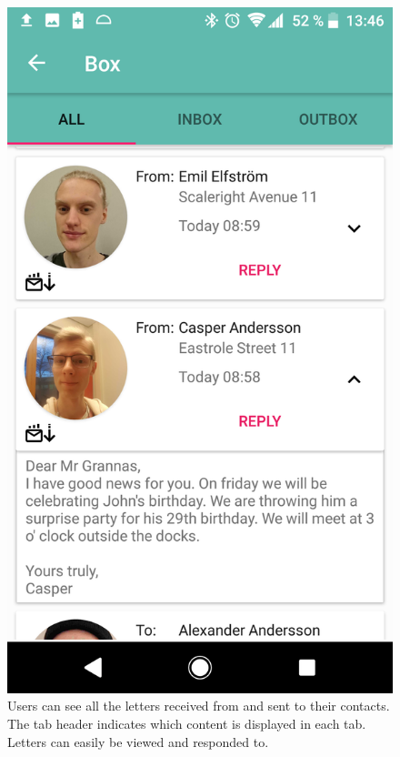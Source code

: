 \documentclass[acmlarge, review=false, screen=true]{acmart}
\begin{document}
\begin{figure}[!tbp]
        \hfill
        \begin{minipage}[b]{0.4\textwidth}
          \includegraphics[width=\textwidth]{images/BOX.png}
          \caption{Users can see all the letters received from and sent to their contacts. The tab header indicates which content is displayed in each tab. Letters can easily be viewed and responded to.}
          \label{fig:box}
        \end{minipage}
      \end{figure}
\end{document}
